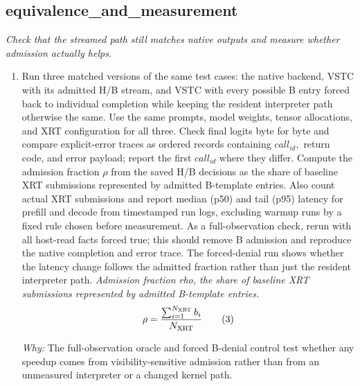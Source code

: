 \documentclass[10pt,a4paper]{article}
\begin{document}
\subsection*{equivalence\_and\_measurement}
\emph{Check that the streamed path still matches native outputs and measure whether admission actually helps.}
\begin{enumerate}[leftmargin=*,start=5]
  \item Run three matched versions of the same test cases: the native backend, VSTC with its admitted H/B stream, and VSTC with every possible B entry forced back to individual completion while keeping the resident interpreter path otherwise the same. Use the same prompts, model weights, tensor allocations, and XRT configuration for all three. Check final logits byte for byte and compare explicit-error traces as ordered records containing \(call_{id},\) return code, and error payload;\allowbreak{} report the first \(call_{id}\) where they differ. Compute the admission fraction \(\rho \) from the saved H/B decisions as the share of baseline XRT submissions represented by admitted B-template entries. Also count actual XRT submissions and report median (p50) and tail (p95) latency for prefill and decode from timestamped run logs, excluding warmup runs by a fixed rule chosen before measurement. As a full-observation check, rerun with all host-read facts forced true;\allowbreak{} this should remove B admission and reproduce the native completion and error trace. The forced-denial run shows whether the latency change follows the admitted fraction rather than just the resident interpreter path.
\noindent\emph{Admission fraction rho, the share of baseline XRT submissions represented by admitted B-template entries.}
\begin{equation}
\resizebox{\ifdim\width>\linewidth \linewidth\else\width\fi}{!}{$\displaystyle \rho = \frac{\sum_{i=1}^{N_{\mathrm{XRT}}} b_i}{N_{\mathrm{XRT}}}$} \tag{3}
\end{equation}
\par\emph{Why:} The full-observation oracle and forced B-denial control test whether any speedup comes from visibility-sensitive admission rather than from an unmeasured interpreter or a changed kernel path.
\end{enumerate}
\end{document}
